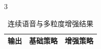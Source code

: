 \begin{PaperTable}{3}

\begin{table}[!htbp]
\centering\caption{连续语音与多粒度增强结果}
\begin{tabular}{@{}lrr@{}}
\toprule
\begin{minipage}[b]{\dimexpr 0.400000\linewidth-1.600000\tabcolsep\relax}\raggedright
输出\strut
\end{minipage} & \begin{minipage}[b]{\dimexpr 0.300000\linewidth-1.200000\tabcolsep\relax}\raggedleft
基础策略\strut
\end{minipage} & \begin{minipage}[b]{\dimexpr 0.300000\linewidth-1.200000\tabcolsep\relax}\raggedleft
增强策略\strut
\end{minipage}\tabularnewline
\midrule


\end{tabular}
\end{table}
\end{PaperTable}
